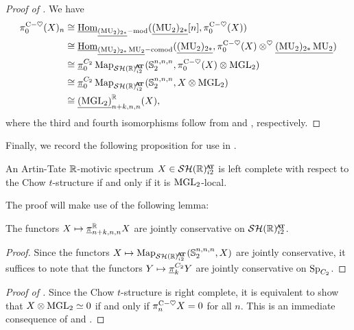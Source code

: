 \begin{proof}[Proof of ]
%
  We have
  \begin{align*}
    \pi_{0} ^{\ch} (X)_n &\cong \uHom_{\underline{(\MU_2)_{2*}}-\mathrm{mod}} (\underline{(\MU_2)_{2*}}[n], \pi_0 ^{\ch} (X)) \\
    &\cong \uHom_{\underline{(\MU_2)_{2*} \MU_2}-\mathrm{comod}} (\underline{(\MU_2)_{2*}}, \pi_0 ^{\ch} (X) \otimes^{\heartsuit} \underline{(\MU_2)_{2*} \MU_2}) \\
    &\cong \piu_0 ^{C_2} \Map_{\SHRat} (\Ss_2^{n,n,n}, \pi_0 ^{\ch} (X) \otimes \MGL_2) \\
    &\cong \piu_0 ^{C_2} \Map_{\SHRat} (\Ss_2^{n,n,n}, X \otimes \MGL_2) \\
    &\cong \underline{(\MGL_2)}^{\R}_{n+k,n,n} (X),
  \end{align*}
  where the third and fourth isomorphisms follow from  and , respectively.
\end{proof}

%

Finally, we record the following proposition for use in .

\begin{prop} \label{prop:complete-compare}
  An Artin-Tate $\mathbb{R}$-motivic spectrum $X \in \SHRat$ is left complete with respect to the Chow $t$-structure if and only if it is $\mathrm{MGL}_2$-local.
\end{prop}

The proof will make use of the following lemma:

\begin{lem} \label{lem:conservative-funcs}
  The functors $X \mapsto \underline{\pi}_{n+k,n,n} ^{\mathbb{R}} X$ are jointly conservative on $\SHRat$.
\end{lem}

\begin{proof}
  Since the functors $X \mapsto \Map_{\SHRat} (\Ss_2^{n,n,n}, X)$ are jointly conservative, it suffices to note that the functors $Y \mapsto \underline{\pi}_{k} ^{C_2} Y$ are jointly conservative on $\operatorname{\mathrm{Sp}}_{C_2}$.
\end{proof}

\begin{proof}[Proof of ]
  Since the Chow $t$-structure is right complete, it is equivalent to show that $X \otimes \mathrm{MGL}_2 \simeq 0$ if and only if $\pi_{n} ^{\mathrm{C}-\heartsuit} X = 0$ for all $n$. This is an immediate consequence of  and .
\end{proof}


